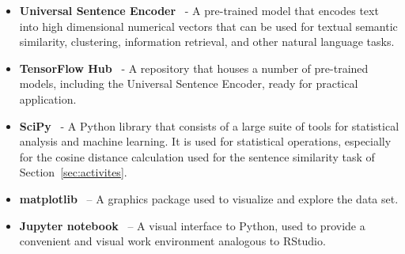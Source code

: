 \begin{itemize}
    \item \textbf{Universal Sentence Encoder}~\cite{DBLP:journals/corr/abs-1803-11175} - A pre-trained model that encodes text into high dimensional numerical vectors that can be used for textual semantic similarity, clustering, information retrieval, and other natural language tasks.  
    
    \item \textbf{TensorFlow Hub}~\cite{tensorflow2015-whitepaper} - A repository that houses a number of pre-trained models, including the Universal Sentence Encoder, ready for practical application. 
    
    \item \textbf{SciPy}~\cite{2020SciPy-NMeth} - A Python library that consists of a large suite of tools for statistical analysis and machine learning. It is used for statistical operations, especially for the cosine distance calculation used for the sentence similarity task of Section~\ref{sec:activites}.  
    
    \item \textbf{matplotlib}~\cite{4160265} -- A graphics package used to visualize and explore the data set.
    
    \item \textbf{Jupyter notebook}~\cite{Kluyver2016jupyter} -- A visual interface to Python, used to provide a convenient and visual work environment analogous to RStudio.
    
\end{itemize}